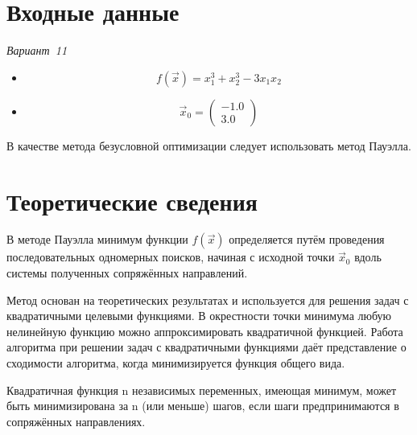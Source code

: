 \documentclass[a4paper,12pt,notitlepage,headsepline,pdftex]{scrartcl}
\begin{document}
\section{Входные данные}
  \hfill\emph{Вариант~11}

  \begin{itemize}
    \item \begin{equation}
        f\left( \vec{x} \right) = x_1^3 + x_2^3 - 3 x_1 x_2
        \label{eq:f}
      \end{equation}
    \item \begin{equation}
        \vec{x}_0 = \left( \begin{matrix}
          -1.0\\
          3.0
        \end{matrix}\right)
        \label{eq:x0}
      \end{equation}
  \end{itemize}

  В качестве метода безусловной оптимизации следует использовать метод
  Пауэлла.
  \newpage
\section{Теоретические сведения}
  В методе Пауэлла минимум функции $f\left( \vec{x} \right)$
  определяется путём проведения последовательных одномерных поисков, начиная с
  исходной точки $\vec{x}_0$ вдоль системы полученных сопряжённых направлений.

  Метод основан на теоретических результатах и используется для решения задач
  с квадратичными целевыми функциями.
  В окрестности точки минимума любую нелинейную функцию можно аппроксимировать
  квадратичной функцией.
  Работа алгоритма при решении задач с квадратичными функциями даёт
  представление о сходимости алгоритма, когда минимизируется функция общего
  вида.

  Квадратичная функция n независимых переменных, имеющая минимум, может быть
  минимизирована за n (или меньше) шагов, если шаги предпринимаются в
  сопряжённых направлениях.
\end{document}
